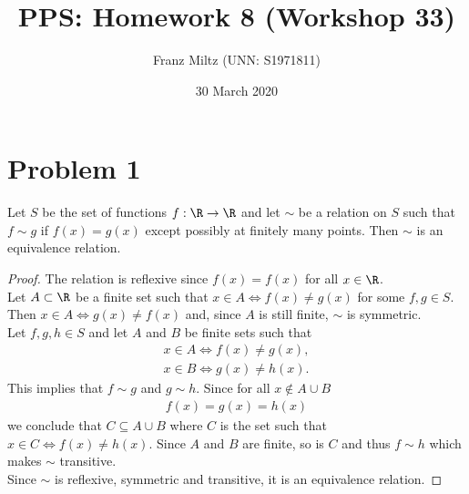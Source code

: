 \documentclass{article}
\title{PPS: Homework 8 (Workshop 33)}
\author{Franz Miltz (UNN: S1971811)}
\date{30 March 2020}
\begin{document}
\maketitle
\section*{Problem 1}
\begin{claim}
  Let $S$ be the set of functions $f:\R\to\R$ and let $\sim$ be a relation on $S$ such that $f\sim g$ if $f(x)=g(x)$ except possibly at finitely many points. 
  Then $\sim$ is an equivalence relation.
\end{claim}
\begin{proof}
  The relation is reflexive since $f(x)=f(x)$ for all $x\in\R$.\\
  Let $A\subset \R$ be a finite set such that 
  $
    x \in A \Leftrightarrow f(x)\not= g(x)
  $
  for some $f,g\in S$.
  Then 
  $
    x\in A \Leftrightarrow g(x)\not=f(x)
  $
  and, since $A$ is still finite, $\sim$ is symmetric.\\
  Let $f,g,h \in S$ and let $A$ and $B$ be finite sets such that 
  \begin{align*}
    x\in A \Leftrightarrow f(x)\not= g(x),\\
    x\in B \Leftrightarrow g(x)\not= h(x).
  \end{align*}
  This implies that $f\sim g$ and $g\sim h$. Since for all $x\not\in A\cup B$
  \begin{align*}
    f(x)=g(x)=h(x)
  \end{align*}
  we conclude that $C\subseteq A \cup B$ where $C$ is the set such that $x\in C \Leftrightarrow f(x)\not=h(x)$. 
  Since $A$ and $B$ are finite, so is $C$ and thus $f\sim h$ which makes $\sim$ transitive.\\
  Since $\sim$ is reflexive, symmetric and transitive, it is an equivalence relation. 
\end{proof}
\end{document}
